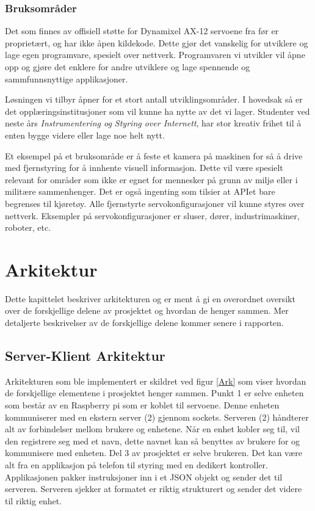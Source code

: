 \documentclass[12pt]{report}
\begin{document}
\subsection{Bruksområder}
Det som finnes av offisiell støtte for Dynamixel AX-12 servoene fra før er proprietært, og har ikke åpen kildekode. Dette gjør det vanskelig for utviklere og lage egen programvare, spesielt over nettverk. Programvaren vi utvikler vil åpne opp og gjøre det enklere for andre utviklere og lage spennende og sammfunnsnyttige applikasjoner. 

Løsningen vi tilbyr åpner for et stort antall utviklingsområder. I hovedsak så er det opplæringsinstitusjoner som vil kunne ha nytte av det vi lager. Studenter ved neste års \textit{Instrumentering og Styring over Internett}, har stor kreativ frihet til å enten bygge videre eller lage noe helt nytt. 

Et eksempel på et bruksområde er å feste et kamera på maskinen for så å drive med fjernstyring for å innhente visuell informasjon. Dette vil være spesielt relevant for områder som ikke er egnet for mennesker på grunn av miljø eller i militære sammenhenger. Det er også ingenting som tilsier at APIet bare begrenses til kjøretøy. Alle fjernstyrte servokonfigurasjoner vil kunne styres over nettverk. Eksempler på servokonfigurasjoner er sluser, dører, industrimaskiner, roboter, etc.


\clearpage

\chapter{Arkitektur}
Dette kapittelet beskriver arkitekturen og er ment å gi en overordnet oversikt over de forskjellige delene av prosjektet og hvordan de henger sammen. Mer detaljerte beskrivelser av de forskjellige delene kommer senere i rapporten.

\section{Server-Klient Arkitektur}
Arkitekturen som ble implementert er skildret ved figur \ref{Ark} som viser hvordan de forskjellige elementene i prosjektet henger sammen. Punkt 1 er selve enheten som består av en Raspberry pi\cite{Raspberry} som er koblet til servoene. Denne enheten kommuniserer med en ekstern server (2) gjennom sockets\cite{Sockets}. Serveren (2) håndterer alt av forbindelser mellom brukere og enhetene. Når en enhet kobler seg til, vil den registrere seg med et navn, dette navnet kan så benyttes av brukere for og kommunisere med enheten. Del 3 av prosjektet er selve brukeren. Det kan være alt fra en applikasjon på telefon til styring med en dedikert kontroller. Applikasjonen pakker instruksjoner inn i et JSON objekt\cite{JSON} og sender det til serveren. Serveren sjekker at formatet er riktig strukturert og sender det videre til riktig enhet.
\end{document}
